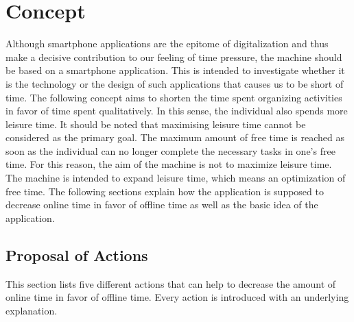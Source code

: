 \documentclass[12pt,numbers=noenddot,parskip,bibliography=totocnumbered,listof=totocnumbered,draft=true]{scrreprt}
\begin{document}
\section{Concept}
Although smartphone applications are the epitome of digitalization and thus make a decisive contribution to our feeling of time pressure, the machine should be based on a smartphone application. This is intended to investigate whether it is the technology or the design of such applications that causes us to be short of time. The following concept aims to shorten the time spent organizing activities in favor of time spent qualitatively. In this sense, the individual also spends more leisure time. It should be noted that maximising leisure time cannot be considered as the primary goal. The maximum amount of free time is reached as soon as the individual can no longer complete the necessary tasks in one's free time. For this reason, the aim of the machine is not to maximize leisure time. The machine is intended to expand leisure time, which means an optimization of free time. The following sections explain how the application is supposed to decrease online time in favor of offline time as well as the basic idea of the application.

\subsection{Proposal of Actions}
This section lists five different actions that can help to decrease the amount of online time in favor of offline time. Every action is introduced with an underlying explanation.
\end{document}
